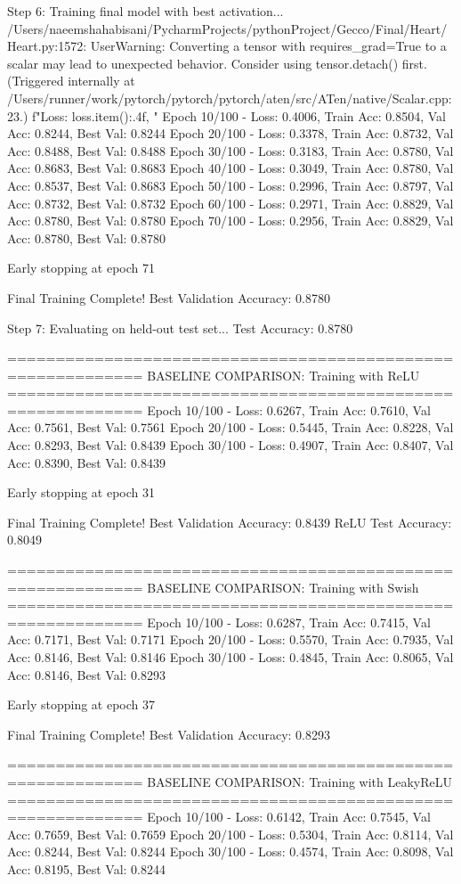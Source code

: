 Step 6: Training final model with best activation...
/Users/naeemshahabisani/PycharmProjects/pythonProject/Gecco/Final/Heart/Heart.py:1572: UserWarning: Converting a tensor with requires_grad=True to a scalar may lead to unexpected behavior.
Consider using tensor.detach() first. (Triggered internally at /Users/runner/work/pytorch/pytorch/pytorch/aten/src/ATen/native/Scalar.cpp:23.)
  f"Loss: {loss.item():.4f}, "
Epoch  10/100 - Loss: 0.4006, Train Acc: 0.8504, Val Acc: 0.8244, Best Val: 0.8244
Epoch  20/100 - Loss: 0.3378, Train Acc: 0.8732, Val Acc: 0.8488, Best Val: 0.8488
Epoch  30/100 - Loss: 0.3183, Train Acc: 0.8780, Val Acc: 0.8683, Best Val: 0.8683
Epoch  40/100 - Loss: 0.3049, Train Acc: 0.8780, Val Acc: 0.8537, Best Val: 0.8683
Epoch  50/100 - Loss: 0.2996, Train Acc: 0.8797, Val Acc: 0.8732, Best Val: 0.8732
Epoch  60/100 - Loss: 0.2971, Train Acc: 0.8829, Val Acc: 0.8780, Best Val: 0.8780
Epoch  70/100 - Loss: 0.2956, Train Acc: 0.8829, Val Acc: 0.8780, Best Val: 0.8780

Early stopping at epoch 71

Final Training Complete!
Best Validation Accuracy: 0.8780

Step 7: Evaluating on held-out test set...
Test Accuracy: 0.8780

============================================================
BASELINE COMPARISON: Training with ReLU
============================================================
Epoch  10/100 - Loss: 0.6267, Train Acc: 0.7610, Val Acc: 0.7561, Best Val: 0.7561
Epoch  20/100 - Loss: 0.5445, Train Acc: 0.8228, Val Acc: 0.8293, Best Val: 0.8439
Epoch  30/100 - Loss: 0.4907, Train Acc: 0.8407, Val Acc: 0.8390, Best Val: 0.8439

Early stopping at epoch 31

Final Training Complete!
Best Validation Accuracy: 0.8439
ReLU Test Accuracy: 0.8049

============================================================
BASELINE COMPARISON: Training with Swish
============================================================
Epoch  10/100 - Loss: 0.6287, Train Acc: 0.7415, Val Acc: 0.7171, Best Val: 0.7171
Epoch  20/100 - Loss: 0.5570, Train Acc: 0.7935, Val Acc: 0.8146, Best Val: 0.8146
Epoch  30/100 - Loss: 0.4845, Train Acc: 0.8065, Val Acc: 0.8146, Best Val: 0.8293

Early stopping at epoch 37

Final Training Complete!
Best Validation Accuracy: 0.8293

============================================================
BASELINE COMPARISON: Training with LeakyReLU
============================================================
Epoch  10/100 - Loss: 0.6142, Train Acc: 0.7545, Val Acc: 0.7659, Best Val: 0.7659
Epoch  20/100 - Loss: 0.5304, Train Acc: 0.8114, Val Acc: 0.8244, Best Val: 0.8244
Epoch  30/100 - Loss: 0.4574, Train Acc: 0.8098, Val Acc: 0.8195, Best Val: 0.8244

